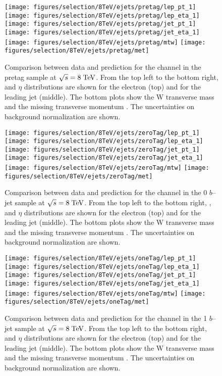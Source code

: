 \begin{figure}
  \centering
  \texttt{[image: figures/selection/8TeV/ejets/pretag/lep\_pt\_1]}
  \texttt{[image: figures/selection/8TeV/ejets/pretag/lep\_eta\_1]}
  \texttt{[image: figures/selection/8TeV/ejets/pretag/jet\_pt\_1]}
  \texttt{[image: figures/selection/8TeV/ejets/pretag/jet\_eta\_1]}
  \texttt{[image: figures/selection/8TeV/ejets/pretag/mtw]}
  \texttt{[image: figures/selection/8TeV/ejets/pretag/met]}
  \caption{Comparison between data and prediction for the \ejets{} channel in the pretag
    sample at $\sqrt{s} = 8 \; \mathrm{TeV}{}$.  From the top left to the bottom
    right, \pt{} and $\eta$ distributions are shown for the
    electron (top) and for the leading jet (middle). The bottom plots
    show the W transverse mass \mtw{} and the missing transverse
    momentum \met{}. 
    The uncertainties on background normalization are shown.
  }
  \label{fig:2012ele_pretag}
\end{figure}
%
\begin{figure}
  \centering
  \texttt{[image: figures/selection/8TeV/ejets/zeroTag/lep\_pt\_1]}
  \texttt{[image: figures/selection/8TeV/ejets/zeroTag/lep\_eta\_1]}
  \texttt{[image: figures/selection/8TeV/ejets/zeroTag/jet\_pt\_1]}
  \texttt{[image: figures/selection/8TeV/ejets/zeroTag/jet\_eta\_1]}
  \texttt{[image: figures/selection/8TeV/ejets/zeroTag/mtw]}
  \texttt{[image: figures/selection/8TeV/ejets/zeroTag/met]}
  \caption{Comparison between data and prediction for the \ejets{}
    channel in the 0 $b$--jet sample at $\sqrt{s} = 8 \; \mathrm{TeV}{}$.  From
    the top left to the bottom right, \pt{}, and $\eta$ distributions are shown for the
    electron (top) and for the leading jet (middle). The bottom plots
    show the W transverse mass \mtw{} and the missing transverse
    momentum \met{}.
    The uncertainties on background normalization are shown.
  }
  \label{fig:2012ele_0tag}
\end{figure}
%
\begin{figure}
  \centering
  \texttt{[image: figures/selection/8TeV/ejets/oneTag/lep\_pt\_1]}
  \texttt{[image: figures/selection/8TeV/ejets/oneTag/lep\_eta\_1]}
  \texttt{[image: figures/selection/8TeV/ejets/oneTag/jet\_pt\_1]}
  \texttt{[image: figures/selection/8TeV/ejets/oneTag/jet\_eta\_1]}
  \texttt{[image: figures/selection/8TeV/ejets/oneTag/mtw]}
  \texttt{[image: figures/selection/8TeV/ejets/oneTag/met]}
  \caption{Comparison between data and prediction for the \ejets{}
    channel in the 1 $b$--jet sample at $\sqrt{s} = 8 \; \mathrm{TeV}{}$.  From
    the top left to the bottom right, \pt{} and $\eta$ distributions are shown for the
    electron (top) and for the leading jet (middle). The bottom plots
    show the W transverse mass \mtw{} and the missing transverse
    momentum \met{}.
    The uncertainties on background normalization are shown.
  }
  \label{fig:2012ele_1tag}
\end{figure}
